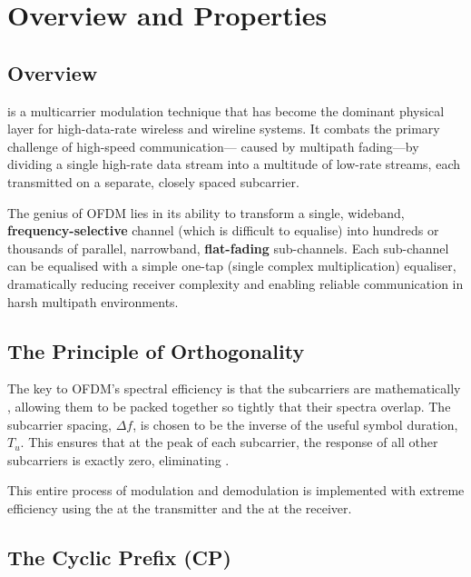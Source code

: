 \section{Overview and Properties}

\subsection{Overview}

 is a multicarrier modulation technique that has become the dominant physical layer for high-data-rate wireless and wireline systems. It combats the primary challenge of high-speed communication— caused by multipath fading—by dividing a single high-rate data stream into a multitude of low-rate streams, each transmitted on a separate, closely spaced subcarrier.

\begin{keyconcept}
    The genius of OFDM lies in its ability to transform a single, wideband, \textbf{frequency-selective} channel (which is difficult to equalise) into hundreds or thousands of parallel, narrowband, \textbf{flat-fading} sub-channels. Each sub-channel can be equalised with a simple one-tap (single complex multiplication) equaliser, dramatically reducing receiver complexity and enabling reliable communication in harsh multipath environments.
\end{keyconcept}


\subsection{The Principle of Orthogonality}

The key to OFDM's spectral efficiency is that the subcarriers are mathematically , allowing them to be packed together so tightly that their spectra overlap. The subcarrier spacing, $\Delta f$, is chosen to be the inverse of the useful symbol duration, $T_u$. This ensures that at the peak of each subcarrier, the response of all other subcarriers is exactly zero, eliminating .

This entire process of modulation and demodulation is implemented with extreme efficiency using the  at the transmitter and the  at the receiver.


\subsection{The Cyclic Prefix (CP)}

